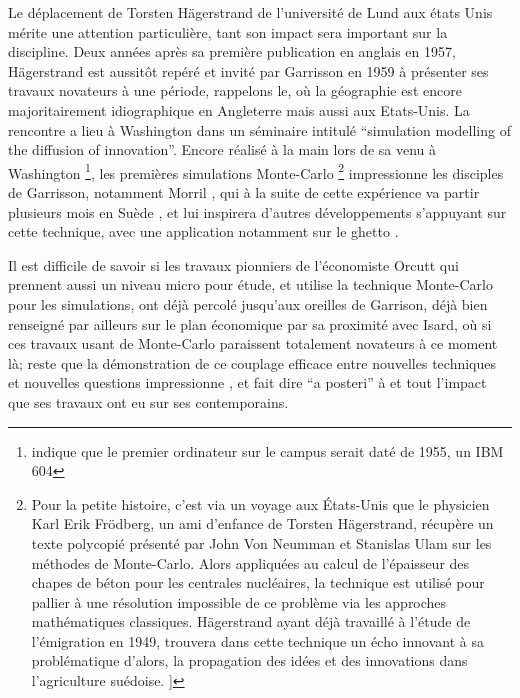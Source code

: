 Le déplacement de Torsten Hägerstrand de l'université de Lund aux états Unis mérite une attention particulière, tant son impact sera important sur la discipline. Deux années après sa première publication en anglais en 1957, Hägerstrand est aussitôt repéré et invité par Garrisson en 1959 à présenter ses travaux novateurs à une période, rappelons le, où la géographie est encore majoritairement idiographique en Angleterre mais aussi aux Etats-Unis. La rencontre a lieu à Washington dans un séminaire intitulé \foreignquote{english}{simulation modelling of the diffusion of innovation}. Encore réalisé à la main lors de sa venu à Washington \footnote{ \textcite{Barnes2006} indique que le premier ordinateur sur le campus serait daté de 1955, un IBM 604}, les premières simulations Monte-Carlo \footnote{Pour la petite histoire, c'est via un voyage aux États-Unis que le physicien Karl Erik Frödberg, un ami d'enfance de Torsten Hägerstrand, récupère un texte polycopié présenté par John Von Neumman et Stanislas Ulam sur les méthodes de Monte-Carlo. Alors appliquées au calcul de l'épaisseur des chapes de béton pour les centrales nucléaires, la technique est utilisé pour pallier à une résolution impossible de ce problème via les approches mathématiques classiques.  Hägerstrand ayant déjà travaillé à l'étude de l'émigration en 1949, trouvera dans cette technique un écho innovant à sa problématique d'alors, la propagation des idées et des innovations dans l'agriculture suédoise. \autocite[26-28]{Gould2004}]} impressionne les disciples de Garrisson, notamment Morril \autocite[120]{Unwin1992}, qui à la suite de cette expérience va partir plusieurs mois en Suède \autocite{Morril2005}, et lui inspirera d'autres développements s'appuyant sur cette technique, avec une application notamment sur le ghetto \textcite{Marble1972}.

Il est difficile de savoir si les travaux pionniers de l'économiste Orcutt \autocite{Orcutt1957, Orcutt1960} qui prennent aussi un niveau micro pour étude, et utilise la technique Monte-Carlo pour les simulations, ont déjà percolé jusqu'aux oreilles de Garrison, déjà bien renseigné par ailleurs sur le plan économique par sa proximité avec Isard, où si ces travaux usant de Monte-Carlo paraissent totalement novateurs à ce moment là; reste que la démonstration de ce couplage efficace entre nouvelles techniques et nouvelles questions impressionne \autocite[120]{Unwin1992}, et fait dire \foreignquote{latin}{a posteri} à \textcite{Morril2005} et \textcite{Gould1970} tout l'impact que ses travaux ont eu sur ses contemporains.

